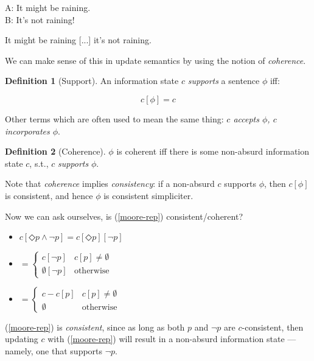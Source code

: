 \documentclass[nols,twoside,nofonts,nobib,nohyper]{tufte-handout}
\theoremstyle{definition}
\newtheorem{definition}{Definition}[section]
\begin{document}
\ex
A: It might be raining.\\
B: It's not raining!
\xe

\ex
It might be raining [...] it's not raining.
\xe

We can make sense of this in update semantics by using the notion of \textit{coherence}.

\begin{definition}[Support]
  An information state $c$ \textit{supports} a sentence $ϕ$ iff:

  $$c[ϕ] = c$$

  Other terms which are often used to mean the same thing: \textit{$c$ accepts $\phi$, $c$ incorporates $\phi$}.
\end{definition}

\begin{definition}[Coherence]
$ϕ$ is coherent iff there is some non-absurd information state $c$, s.t., $c$ \textit{supports} $ϕ$.
\end{definition}

Note that \textit{coherence} implies \textit{consistency}: if a non-absurd $c$ supports $ϕ$, then $c[ϕ]$ is consistent, and hence $ϕ$ is consistent simpliciter.

Now we can ask ourselves, is (\ref{moore-rep}) consistent/coherent?

\begin{itemize}
    \item $c[◇ p ∧ ¬ p] = c[◇ p][¬ p]$
  \item $= \begin{cases}
    c[¬ p]&c[p] ≠ ∅\\
    ∅[¬ p]&\text{otherwise}
   \end{cases}$
  \item $= \begin{cases}
    c - c[p]&c[p] ≠ ∅\\
    ∅&\text{otherwise}
    \end{cases}$
\end{itemize}

(\ref{moore-rep}) is \textit{consistent}, since as long as both $p$ and $¬ p$ are $c$-consistent, then updating $c$ with (\ref{moore-rep}) will result in a non-absurd information state --- namely, one that supports $¬ p$.
\end{document}

